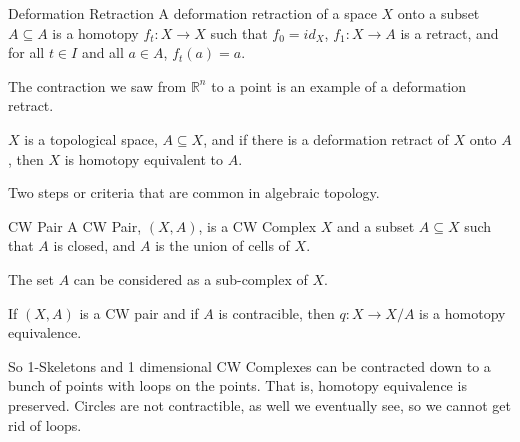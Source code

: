         \begin{ldefinition}{Deformation Retraction}
            A deformation retraction of a space
            $X$ onto a subset $A\subseteq{A}$ is a homotopy
            $f_{t}:X\rightarrow{X}$ such that $f_{0}=id_{X}$,
            $f_{1}:X\rightarrow{A}$ is a retract, and for
            all $t\in{I}$ and all $a\in{A}$, $f_{t}(a)=a$.
        \end{ldefinition}
        \begin{example}
            The contraction we saw from $\mathbb{R}^{n}$ to
            a point is an example of a deformation retract.
        \end{example}
        \begin{theorem}
            $X$ is a topological space, $A\subseteq{X}$, and
            if there is a deformation retract of $X$ onto
            $A$, then $X$ is homotopy equivalent to $A$.
        \end{theorem}
        Two steps or criteria that are common in algebraic
        topology.
        \begin{ldefinition}{CW Pair}
            A CW Pair, $(X,A)$, is a CW Complex $X$ and a
            subset $A\subseteq{X}$ such that $A$ is closed,
            and $A$ is the union of cells of $X$.
        \end{ldefinition}
        The set $A$ can be considered as a sub-complex
        of $X$.
        \begin{theorem}
            If $(X,A)$ is a CW pair and if $A$ is
            contracible, then $q:X\rightarrow{X}/A$
            is a homotopy equivalence.
        \end{theorem}
        So 1-Skeletons and 1 dimensional CW Complexes can
        be contracted down to a bunch of points with loops
        on the points. That is, homotopy equivalence is
        preserved. Circles are not contractible, as well
        we eventually see, so we cannot get rid of loops.
